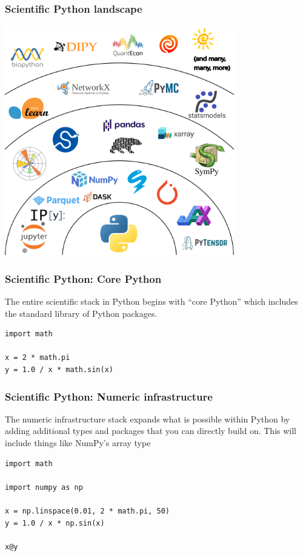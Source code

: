 \documentclass[
    xcolor={svgnames,dvipsnames},
    hyperref={colorlinks, citecolor=DeepPink4, linkcolor=DarkRed, urlcolor=DarkBlue}
]{beamer}  %
\newcommand{\1}{\mathbbm 1}
\begin{document}
\begin{frame}
    \frametitle{Scientific Python landscape}

    \begin{center}
        \includegraphics[width=0.75\textwidth]{python_landscape.png}
    \end{center}

\end{frame}

\begin{frame}[fragile]
    \frametitle{Scientific Python: Core Python}

    The entire scientific stack in Python begins with ``core Python'' which includes the standard
    library of Python packages.

    \begin{verbatim}
import math

x = 2 * math.pi
y = 1.0 / x * math.sin(x)
    \end{verbatim}

\end{frame}

\begin{frame}[fragile]
    \frametitle{Scientific Python: Numeric infrastructure}

    The numeric infrastructure stack expands what is possible within Python by adding additional
    types and packages that you can directly build on. This will include things like NumPy's
    array type

    \begin{verbatim}
import math

import numpy as np

x = np.linspace(0.01, 2 * math.pi, 50)
y = 1.0 / x * np.sin(x)

x@y
    \end{verbatim}

\end{frame}
\end{document}
